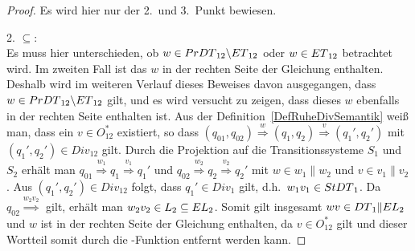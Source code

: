 \begin{proof} Es wird hier nur der 2.\ und 3.\ Punkt bewiesen.

  2. \glqq{}$\subseteq$\grqq{}:\\
  Es muss hier unterschieden, ob $w\in PrDT{}_{12}\backslash ET{}_{12}$ oder
  $w\in ET{}_{12}$ betrachtet wird. Im zweiten Fall ist das $w$ in der rechten
  Seite der Gleichung enthalten. Deshalb wird im weiteren Verlauf dieses
  Beweises davon ausgegangen, dass $w\in PrDT{}_{12}\backslash ET{}_{12}$
  gilt, und es wird versucht zu zeigen, dass dieses $w$ ebenfalls in der
  rechten Seite enthalten ist. Aus der Definition~\ref{DefRuheDivSemantik} weiß
  man, dass ein $v\in O^*_{12}$ existiert, so dass $(q_{01},q_{02})
  \overset{w}{\Rightarrow} (q_1,q_2) \overset{v}{\Rightarrow} (q_1',q_2')$ mit
  $(q_1',q_2')\in Div_{12}$ gilt. Durch die Projektion auf die
  Transitionssysteme $S_1$ und $S_2$ erhält man $q_{01}
  \overset{w_1}{\Rightarrow} q_1 \overset{v_1}{\Rightarrow} q_1'$ und $q_{02}
  \overset{w_2}{\Rightarrow} q_2 \overset{v_2}{\Rightarrow} q_2'$ mit $w\in
  w_1\|w_2$ und $v\in v_1\|v_2$. Aus $(q_1',q_2')\in Div_{12}$ folgt, dass
  \oBdA{} $q_1'\in Div_1$ gilt, d.h.\ $w_1v_1\in StDT{}_1$. Da $q_{02}
  \overset{w_2v_2}{\Rightarrow}$ gilt, erhält man $w_2v_2\in L_2\subseteq
  EL{}_2$. Somit gilt insgesamt $wv\in DT{}_1\|EL{}_2$ und $w$ ist in
  der rechten Seite der Gleichung enthalten, da $v\in O_{12}^*$ gilt und dieser
  Wortteil somit durch die \prunenew{}-Funktion entfernt werden kann.


\end{proof}
